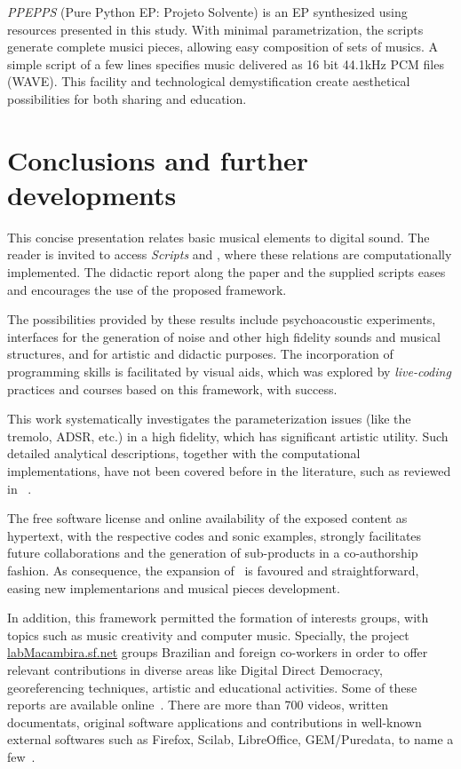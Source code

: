 \emph{PPEPPS} (Pure Python EP: Projeto Solvente) is an EP synthesized using
resources presented in this study. With minimal parametrization, the scripts
generate complete musici pieces, allowing easy composition of sets of
musics. A simple script of a few lines specifies music delivered as 16 bit
44.1kHz PCM files (WAVE). This facility and technological
demystification create aesthetical possibilities for both sharing and education.



\section{Conclusions and further developments}
\label{cap:conclusao}

This concise presentation relates basic musical elements to digital sound.
The reader is invited to access \emph{Scripts} and \massa, where these relations are computationally implemented.
The didactic report along the paper and the supplied scripts eases and encourages the use of the proposed framework. 

The possibilities provided by these results include psychoacoustic experiments, 
interfaces for the generation of noise and other high fidelity sounds and musical structures,
and for artistic and didactic purposes. The incorporation of programming skills is facilitated by visual aids, which
was explored by \emph{live-coding} practices and courses based on this framework, with success.

This work systematically investigates the parameterization issues (like the tremolo, ADSR, etc.) in a high fidelity, which has significant artistic utility. Such detailed analytical descriptions, together with the computational implementations, have not been covered before in the literature, such as reviewed in ~\cite{dissertacao}. 

The free software license and online availability of the exposed content as hypertext, 
with the respective codes and sonic examples, strongly facilitates future collaborations and the generation of sub-products in a co-authorship fashion.
As consequence, the expansion of \massa\ is favoured and straightforward, easing new implementarions and musical pieces development.

In addition, this framework permitted the formation of interests groups, with topics such as music creativity and computer music. 
Specially, the project \url{labMacambira.sf.net} groups Brazilian and foreign co-workers in order to offer relevant contributions 
in diverse areas like Digital Direct Democracy, georeferencing techniques, artistic and educational activities. 
Some of these reports are available online~\cite{dissertacao}. There are more than 700 videos, written documentats,
 original software applications and contributions in well-known external softwares such as Firefox, Scilab, LibreOffice,
 GEM/Puredata, to name a few~\cite{siteLM,wikiLM,vimeoLM}.       

